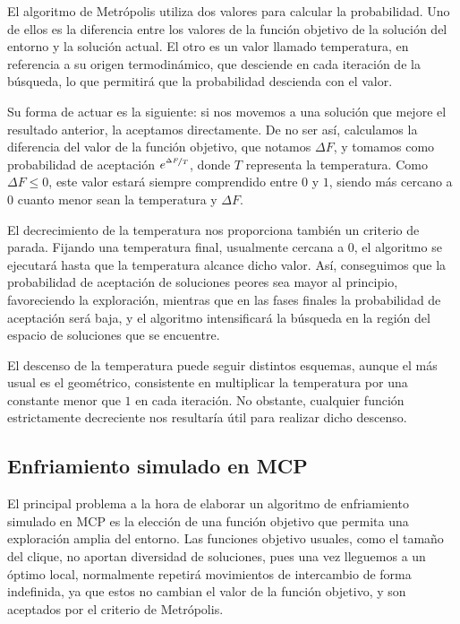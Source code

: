El algoritmo de Metrópolis utiliza dos valores para calcular la probabilidad. Uno de ellos
es la diferencia entre los valores de la función objetivo de la solución del entorno y
la solución actual. El otro es un valor llamado temperatura, en referencia a su origen
termodinámico, que desciende en cada iteración de la búsqueda, lo que permitirá que
la probabilidad descienda con el valor.

Su forma de actuar es la siguiente: si nos movemos a una solución que mejore el resultado
anterior, la aceptamos directamente. De no ser así, calculamos la diferencia del valor de
la función objetivo, que notamos $\Delta F$, y tomamos como probabilidad de aceptación
$e^{\nicefrac{\Delta F}{T}}$, donde $T$ representa la temperatura. Como $\Delta F \leq 0$,
este valor estará siempre comprendido entre $0$ y $1$, siendo más cercano a $0$ cuanto
menor sean la temperatura y $\Delta F$.

El decrecimiento de la temperatura nos proporciona también un criterio de parada. Fijando
una temperatura final, usualmente cercana a $0$, el algoritmo se ejecutará hasta que la
temperatura alcance dicho valor. Así, conseguimos que la probabilidad de aceptación de
soluciones peores sea mayor al principio, favoreciendo la exploración, mientras que en
las fases finales la probabilidad de aceptación será baja, y el algoritmo intensificará
la búsqueda en la región del espacio de soluciones que se encuentre.

El descenso de la temperatura puede seguir distintos esquemas, aunque el más usual es el
geométrico, consistente en multiplicar la temperatura por una constante menor que $1$
en cada iteración. No obstante, cualquier función estrictamente decreciente nos resultaría
útil para realizar dicho descenso.

\subsection{Enfriamiento simulado en MCP}

El principal problema a la hora de elaborar un algoritmo de enfriamiento simulado en MCP
es la elección de una función objetivo que permita una exploración amplia del entorno.
Las funciones objetivo usuales, como el tamaño del clique, no aportan diversidad de soluciones,
pues una vez lleguemos a un óptimo local, normalmente repetirá movimientos de intercambio
de forma indefinida, ya que estos no cambian el valor de la función objetivo, y son
aceptados por el criterio de Metrópolis.


